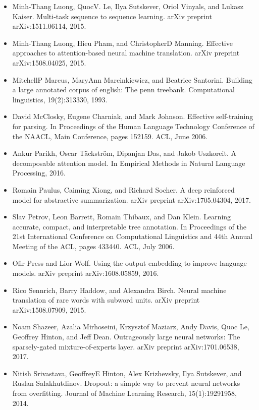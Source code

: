 \documentclass[11pt,a4paper]{article}
\begin{document}
\begin{itemize}
\item [multiseq2seq] Minh-Thang Luong, QuocV. Le, Ilya Sutskever, Oriol Vinyals, and Lukasz Kaiser. Multi-task sequence to sequence learning. arXiv preprint arXiv:1511.06114, 2015.
\item [luong2015effective] Minh-Thang Luong, Hieu Pham, and ChristopherD Manning. Effective approaches to attention-based neural machine translation. arXiv preprint arXiv:1508.04025, 2015.
\item [marcus1993building] MitchellP Marcus, MaryAnn Marcinkiewicz, and Beatrice Santorini. Building a large annotated corpus of english: The penn treebank. Computational linguistics, 19(2):313330, 1993.
\item [mcclosky-etAl:2006:NAACL] David McClosky, Eugene Charniak, and Mark Johnson. Effective self-training for parsing. In Proceedings of the Human Language Technology Conference of the NAACL, Main Conference, pages 152159. ACL, June 2006.
\item [decomposableAttnModel] Ankur Parikh, Oscar Täckström, Dipanjan Das, and Jakob Uszkoreit. A decomposable attention model. In Empirical Methods in Natural Language Processing, 2016.
\item [paulus2017deep] Romain Paulus, Caiming Xiong, and Richard Socher. A deep reinforced model for abstractive summarization. arXiv preprint arXiv:1705.04304, 2017.
\item [petrov-EtAl:2006:ACL] Slav Petrov, Leon Barrett, Romain Thibaux, and Dan Klein. Learning accurate, compact, and interpretable tree annotation. In Proceedings of the 21st International Conference on Computational Linguistics and 44th Annual Meeting of the ACL, pages 433440. ACL, July 2006.
\item [press2016using] Ofir Press and Lior Wolf. Using the output embedding to improve language models. arXiv preprint arXiv:1608.05859, 2016.
\item [sennrich2015neural] Rico Sennrich, Barry Haddow, and Alexandra Birch. Neural machine translation of rare words with subword units. arXiv preprint arXiv:1508.07909, 2015.
\item [shazeer2017outrageously] Noam Shazeer, Azalia Mirhoseini, Krzysztof Maziarz, Andy Davis, Quoc Le, Geoffrey Hinton, and Jeff Dean. Outrageously large neural networks: The sparsely-gated mixture-of-experts layer. arXiv preprint arXiv:1701.06538, 2017.
\item [srivastava2014dropout] Nitish Srivastava, GeoffreyE Hinton, Alex Krizhevsky, Ilya Sutskever, and Ruslan Salakhutdinov. Dropout: a simple way to prevent neural networks from overfitting. Journal of Machine Learning Research, 15(1):19291958, 2014.

\end{itemize}
\end{document}
